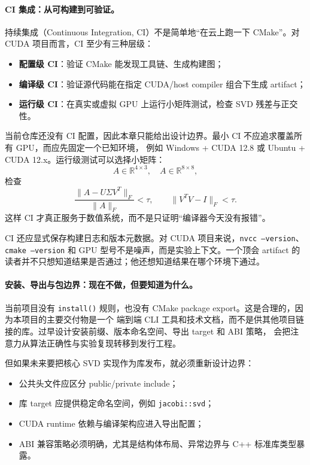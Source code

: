 \paragraph{CI 集成：从可构建到可验证。}

持续集成（Continuous Integration, CI）不是简单地“在云上跑一下 CMake”。对 CUDA 项目而言，CI 至少有三种层级：
\begin{itemize}
    \item \textbf{配置级 CI}：验证 CMake 能发现工具链、生成构建图；
    \item \textbf{编译级 CI}：验证源代码能在指定 CUDA/host compiler 组合下生成 artifact；
    \item \textbf{运行级 CI}：在真实或虚拟 GPU 上运行小矩阵测试，检查 SVD 残差与正交性。
\end{itemize}

当前仓库还没有 CI 配置，因此本章只能给出设计边界。最小 CI 不应追求覆盖所有 GPU，而应先固定一个已知环境，
例如 Windows + CUDA 12.8 或 Ubuntu + CUDA 12.x。运行级测试可以选择小矩阵：
\[
    A\in\mathbb{R}^{4\times 3},\quad A\in\mathbb{R}^{8\times 8},
\]
检查
\[
    \frac{\lVert A-U\Sigma V^T\rVert_F}{\lVert A\rVert_F} < \tau,
    \qquad
    \lVert V^TV-I\rVert_F < \tau.
\]
这样 CI 才真正服务于数值系统，而不是只证明“编译器今天没有报错”。

CI 还应显式保存构建日志和版本元数据。对 CUDA 项目来说，\texttt{nvcc --version}、\texttt{cmake --version}
和 GPU 型号不是噪声，而是实验上下文。一个顶会 artifact 的读者并不只想知道结果是否通过；他还想知道结果在哪个环境下通过。

\paragraph{安装、导出与包边界：现在不做，但要知道为什么。}

当前项目没有 \texttt{install()} 规则，也没有 CMake package export。这是合理的，因为本项目的主要交付物是一个
端到端 CLI 工具和技术文档，而不是供其他项目链接的库。过早设计安装前缀、版本命名空间、导出 target 和 ABI 策略，
会把注意力从算法正确性与实验复现转移到发行工程。

但如果未来要把核心 SVD 实现作为库发布，就必须重新设计边界：
\begin{itemize}
    \item 公共头文件应区分 public/private include；
    \item 库 target 应提供稳定命名空间，例如 \texttt{jacobi::svd}；
    \item CUDA runtime 依赖与编译架构应进入导出配置；
    \item ABI 兼容策略必须明确，尤其是结构体布局、异常边界与 C++ 标准库类型暴露。
\end{itemize}

